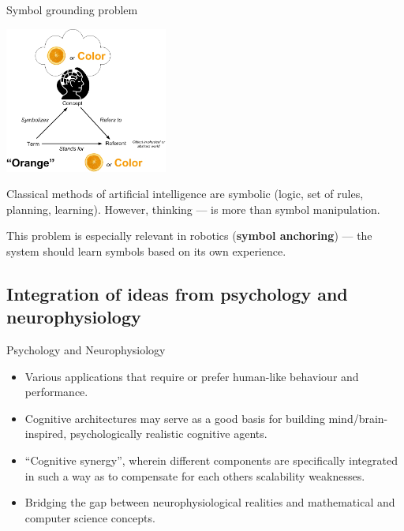 \documentclass[default]{beamer}
\begin{document}
	\begin{frame}{Symbol grounding problem}
		\begin{center}
			\includegraphics[width=0.4\textwidth]{signs/symb_ground.jpg}
		\end{center}
		\small
		Classical methods of artificial intelligence are symbolic (logic, set of rules, planning, learning). However, thinking --- is more than symbol manipulation.
		\par\medskip
		This problem is especially relevant in robotics (\textbf{symbol anchoring}) --- the system should learn symbols based on its own experience.
				
		\par\bigskip
		\nocite{*}
		\printbibliography[keyword={sgp}, resetnumbers=true]
	\end{frame}
	
	\subsection{Integration of ideas from psychology and neurophysiology}
	\begin{frame}{Psychology and Neurophysiology}
		\begin{itemize}
			\item Various applications that require or prefer human-like behaviour and performance.
			\item Cognitive architectures may serve as a good basis for building mind/brain-inspired, psychologically realistic cognitive agents.
			\item ``Cognitive synergy'', wherein different components are specifically integrated in such a way as to compensate for each others scalability weaknesses.
			\item Bridging the gap between neurophysiological realities and mathematical and computer science concepts.
		\end{itemize}
		
		\par\bigskip
		\nocite{*}
		\printbibliography[keyword={agi}, resetnumbers=true]
	\end{frame}
	
\end{document}
